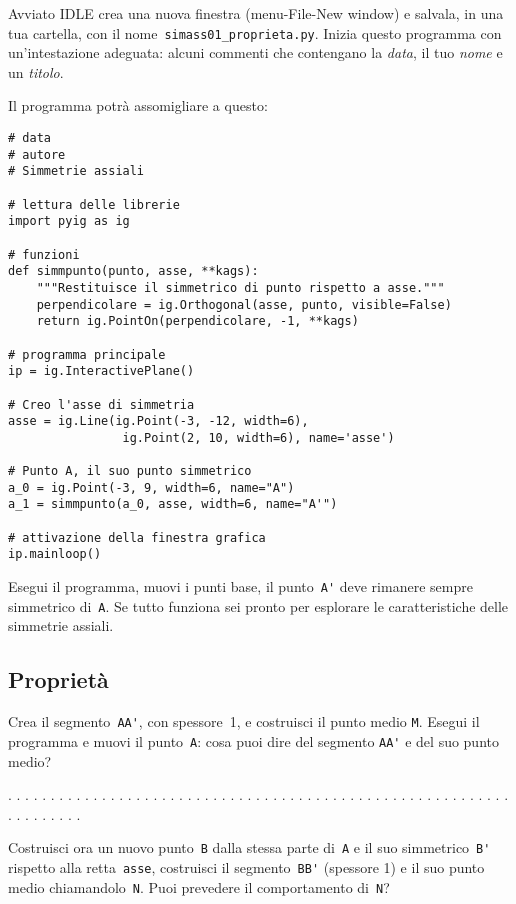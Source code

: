 Avviato IDLE crea una nuova finestra (menu-File-New window) e salvala,
in una tua cartella, con il nome~\lstinline{simass01_proprieta.py}.
Inizia questo programma con un'intestazione adeguata: alcuni commenti che 
contengano la \emph{data}, il tuo \emph{nome} e un \emph{titolo}.

Il programma potrà assomigliare a questo:

\begin{lstlisting}
# data
# autore
# Simmetrie assiali

# lettura delle librerie
import pyig as ig

# funzioni
def simmpunto(punto, asse, **kags):
    """Restituisce il simmetrico di punto rispetto a asse."""
    perpendicolare = ig.Orthogonal(asse, punto, visible=False)
    return ig.PointOn(perpendicolare, -1, **kags)

# programma principale
ip = ig.InteractivePlane()

# Creo l'asse di simmetria
asse = ig.Line(ig.Point(-3, -12, width=6),
                ig.Point(2, 10, width=6), name='asse')

# Punto A, il suo punto simmetrico
a_0 = ig.Point(-3, 9, width=6, name="A")
a_1 = simmpunto(a_0, asse, width=6, name="A'")

# attivazione della finestra grafica
ip.mainloop()
\end{lstlisting}

Esegui il programma, muovi i punti base, il punto~\lstinline{A'} deve rimanere
sempre simmetrico di~\lstinline{A}. Se tutto funziona sei pronto per
esplorare le caratteristiche delle simmetrie assiali.


\subsection{Proprietà}

Crea il segmento~\lstinline{AA'}, con spessore~1, e costruisci il punto medio 
\lstinline{M}.
Esegui il programma e muovi il punto~\lstinline{A}: cosa puoi dire del segmento 
\lstinline{AA'}
e del suo punto medio?

. . . . . . . . . . . . . . . . . . . . . . . . . . . . . . . . . . . . . . . .
. . . . . . . . . . . . . . . . . . . . . . . . . . . .

Costruisci ora un nuovo punto~\lstinline{B} dalla stessa parte di~\lstinline{A}
e il suo simmetrico~\lstinline{B'} rispetto alla retta~\lstinline{asse},
costruisci il segmento~\lstinline{BB'} (spessore 1) e il suo punto medio
chiamandolo~\lstinline{N}.
Puoi prevedere il comportamento di~\lstinline{N}?

